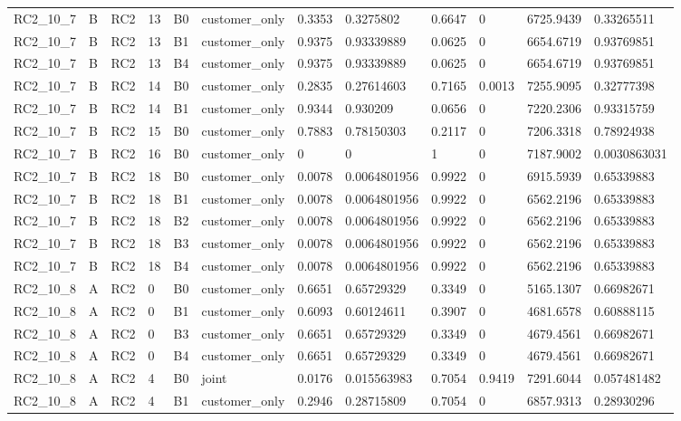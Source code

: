 \begin{longtable}{llllllllllll}
RC2\_10\_7 & B & RC2 & 13 & B0 & customer\_only & 0.3353 & 0.3275802 & 0.6647 & 0 & 6725.9439 & 0.33265511 \\
RC2\_10\_7 & B & RC2 & 13 & B1 & customer\_only & 0.9375 & 0.93339889 & 0.0625 & 0 & 6654.6719 & 0.93769851 \\
RC2\_10\_7 & B & RC2 & 13 & B4 & customer\_only & 0.9375 & 0.93339889 & 0.0625 & 0 & 6654.6719 & 0.93769851 \\
RC2\_10\_7 & B & RC2 & 14 & B0 & customer\_only & 0.2835 & 0.27614603 & 0.7165 & 0.0013 & 7255.9095 & 0.32777398 \\
RC2\_10\_7 & B & RC2 & 14 & B1 & customer\_only & 0.9344 & 0.930209 & 0.0656 & 0 & 7220.2306 & 0.93315759 \\
RC2\_10\_7 & B & RC2 & 15 & B0 & customer\_only & 0.7883 & 0.78150303 & 0.2117 & 0 & 7206.3318 & 0.78924938 \\
RC2\_10\_7 & B & RC2 & 16 & B0 & customer\_only & 0 & 0 & 1 & 0 & 7187.9002 & 0.0030863031 \\
RC2\_10\_7 & B & RC2 & 18 & B0 & customer\_only & 0.0078 & 0.0064801956 & 0.9922 & 0 & 6915.5939 & 0.65339883 \\
RC2\_10\_7 & B & RC2 & 18 & B1 & customer\_only & 0.0078 & 0.0064801956 & 0.9922 & 0 & 6562.2196 & 0.65339883 \\
RC2\_10\_7 & B & RC2 & 18 & B2 & customer\_only & 0.0078 & 0.0064801956 & 0.9922 & 0 & 6562.2196 & 0.65339883 \\
RC2\_10\_7 & B & RC2 & 18 & B3 & customer\_only & 0.0078 & 0.0064801956 & 0.9922 & 0 & 6562.2196 & 0.65339883 \\
RC2\_10\_7 & B & RC2 & 18 & B4 & customer\_only & 0.0078 & 0.0064801956 & 0.9922 & 0 & 6562.2196 & 0.65339883 \\
RC2\_10\_8 & A & RC2 & 0 & B0 & customer\_only & 0.6651 & 0.65729329 & 0.3349 & 0 & 5165.1307 & 0.66982671 \\
RC2\_10\_8 & A & RC2 & 0 & B1 & customer\_only & 0.6093 & 0.60124611 & 0.3907 & 0 & 4681.6578 & 0.60888115 \\
RC2\_10\_8 & A & RC2 & 0 & B3 & customer\_only & 0.6651 & 0.65729329 & 0.3349 & 0 & 4679.4561 & 0.66982671 \\
RC2\_10\_8 & A & RC2 & 0 & B4 & customer\_only & 0.6651 & 0.65729329 & 0.3349 & 0 & 4679.4561 & 0.66982671 \\
RC2\_10\_8 & A & RC2 & 4 & B0 & joint & 0.0176 & 0.015563983 & 0.7054 & 0.9419 & 7291.6044 & 0.057481482 \\
RC2\_10\_8 & A & RC2 & 4 & B1 & customer\_only & 0.2946 & 0.28715809 & 0.7054 & 0 & 6857.9313 & 0.28930296 \\

\end{longtable}
